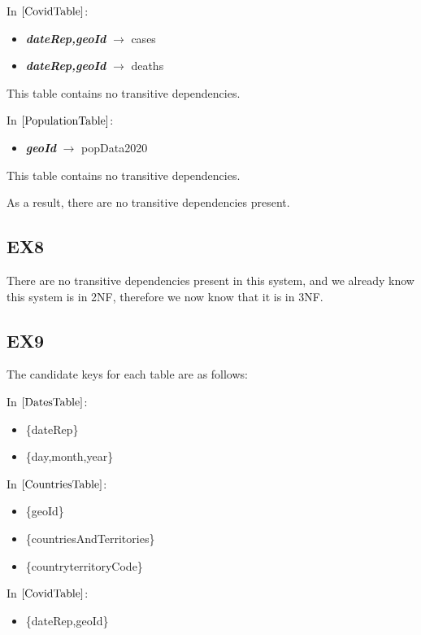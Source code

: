 \documentclass{article}
\begin{document}
In $\ref{CovidTable}$:
\begin{itemize}
\item \textbf{\textit{dateRep,geoId}} $\rightarrow$ cases
\item \textbf{\textit{dateRep,geoId}} $\rightarrow$ deaths
\end{itemize}

This table contains no transitive dependencies.\newline

\newpage
In $\ref{PopulationTable}$:
\begin{itemize}
\item \textbf{\textit{geoId}} $\rightarrow$ popData2020
\end{itemize}

This table contains no transitive dependencies.\newline

As a result, there are no transitive dependencies present.

\subsection{EX8}

There are no transitive dependencies present in this system, and we already know this system is in 2NF, therefore we now know that it is in 3NF.

\subsection{EX9}

The candidate keys for each table are as follows:\newline

In $\ref{DatesTable}$:
\begin{itemize}
\item \{dateRep\}
\item \{day,month,year\}
\end{itemize}

In $\ref{CountriesTable}$:
\begin{itemize}
\item \{geoId\}
\item \{countriesAndTerritories\}
\item \{countryterritoryCode\}
\end{itemize}

In $\ref{CovidTable}$:
\begin{itemize}
\item \{dateRep,geoId\}
\end{itemize}
\end{document}
